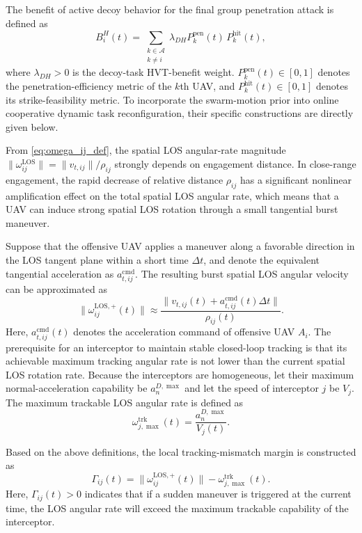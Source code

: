 \documentclass{cja}
\begin{document}
The benefit of active decoy behavior for the final group penetration attack is defined as
\begin{equation}
B_i^{H}(t)
=
\sum_{\substack{k\in\mathcal{A}\\k\neq i}}
\lambda_{DH} P_k^{\mathrm{pen}}(t)\,P_k^{\mathrm{hit}}(t),
\end{equation}
where $\lambda_{DH}>0$ is the decoy-task HVT-benefit weight. $P_k^{\mathrm{pen}}(t)\in[0,1]$ denotes the penetration-efficiency metric of the $k$th UAV, and $P_k^{\mathrm{hit}}(t)\in[0,1]$ denotes its strike-feasibility metric. To incorporate the swarm-motion prior into online cooperative dynamic task reconfiguration, their specific constructions are directly given below.

From \eqref{eq:omega_ij_def}, the spatial LOS angular-rate magnitude $\|\omega_{ij}^{\mathrm{LOS}}\| = \|v_{t,ij}\|/\rho_{ij}$ strongly depends on engagement distance. In close-range engagement, the rapid decrease of relative distance $\rho_{ij}$ has a significant nonlinear amplification effect on the total spatial LOS angular rate, which means that a UAV can induce strong spatial LOS rotation through a small tangential burst maneuver.

Suppose that the offensive UAV applies a maneuver along a favorable direction in the LOS tangent plane within a short time $\Delta t$, and denote the equivalent tangential acceleration as $a_{t,ij}^{\mathrm{cmd}}$. The resulting burst spatial LOS angular velocity can be approximated as
\begin{equation}
\|\omega_{ij}^{\mathrm{LOS},+}(t)\|
\approx
\frac{\|v_{t,ij}(t)+a_{t,ij}^{\mathrm{cmd}}(t)\Delta t\|}{\rho_{ij}(t)}.
\end{equation}
Here, $a_{t,ij}^{\mathrm{cmd}}(t)$ denotes the acceleration command of offensive UAV $A_i$.
The prerequisite for an interceptor to maintain stable closed-loop tracking is that its achievable maximum tracking angular rate is not lower than the current spatial LOS rotation rate. Because the interceptors are homogeneous, let their maximum normal-acceleration capability be $a_n^{D,\max}$ and let the speed of interceptor $j$ be $V_j$. The maximum trackable LOS angular rate is defined as
\begin{equation}
\omega_{j,\max}^{\mathrm{trk}}(t)
=
\frac{a_n^{D,\max}}{V_j(t)}.
\end{equation}

Based on the above definitions, the local tracking-mismatch margin is constructed as
\begin{equation}
\Gamma_{ij}(t)
=
\|\omega_{ij}^{\mathrm{LOS},+}(t)\|
-
\omega_{j,\max}^{\mathrm{trk}}(t).
\end{equation}
Here, $\Gamma_{ij}(t)>0$ indicates that if a sudden maneuver is triggered at the current time, the LOS angular rate will exceed the maximum trackable capability of the interceptor.
\end{document}
